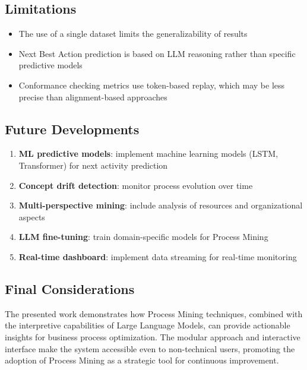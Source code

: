 \documentclass[a4paper,twoside,12pt]{article}
\begin{document}
\subsection{Limitations}

\begin{itemize}
    \item The use of a single dataset limits the generalizability of results
    \item Next Best Action prediction is based on LLM reasoning rather than specific predictive models
    \item Conformance checking metrics use token-based replay, which may be less precise than alignment-based approaches
\end{itemize}

\subsection{Future Developments}

\begin{enumerate}
    \item \textbf{ML predictive models}: implement machine learning models (LSTM, Transformer) for next activity prediction
    \item \textbf{Concept drift detection}: monitor process evolution over time
    \item \textbf{Multi-perspective mining}: include analysis of resources and organizational aspects
    \item \textbf{LLM fine-tuning}: train domain-specific models for Process Mining
    \item \textbf{Real-time dashboard}: implement data streaming for real-time monitoring
\end{enumerate}

\subsection{Final Considerations}

The presented work demonstrates how Process Mining techniques, combined with the interpretive capabilities of Large Language Models, can provide actionable insights for business process optimization. The modular approach and interactive interface make the system accessible even to non-technical users, promoting the adoption of Process Mining as a strategic tool for continuous improvement.
\end{document}

